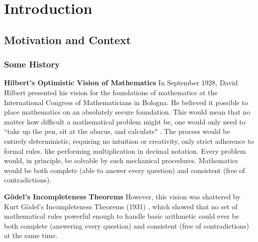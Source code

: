 \chapter{Introduction}



\section{Motivation and Context}




\subsection*{Some History}

\noindent \textbf{Hilbert’s Optimistic Vision of Mathematics}
In September 1928, David Hilbert presented his vision for the foundations of mathematics at the International Congress of Mathematicians in Bologna. He believed it possible to place mathematics on an absolutely secure foundation. This would mean that no matter how difficult a mathematical problem might be, one would only need to ``take up the pen, sit at the abacus, and calculate" \cite{ferreiraProblemaDecisaoMaquina}. The process would be entirely deterministic, requiring no intuition or creativity, only strict adherence to formal rules, like performing multiplication in decimal notation. Every problem would, in principle, be solvable by such mechanical procedures. Mathematics would be both complete (able to answer every question) and consistent (free of contradictions). 

\noindent \textbf{ Gödel’s Incompleteness Theorems} However, this vision was shattered by Kurt Gödel’s Incompleteness Theorems (1931) \cite{Godel}, which showed that no set of mathematical rules powerful enough to handle basic arithmetic could ever be both complete (answering every question) and consistent (free of contradictions) at the same time. 

